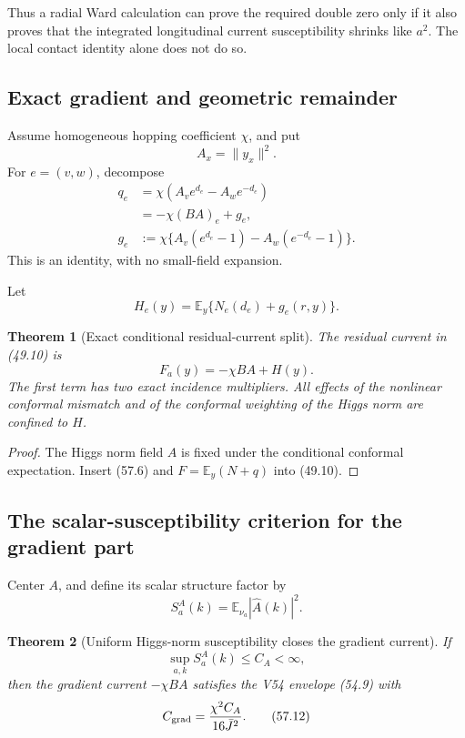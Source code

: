 \documentclass[11pt]{article}
\newtheorem{theorem}{Theorem}[section]
\theoremstyle{remark}
\begin{document}
Thus a radial Ward calculation can prove the required double zero only
if it also proves that the integrated longitudinal current
susceptibility shrinks like \(a^2\).  The local contact identity alone
does not do so.

\subsection{Exact gradient and geometric remainder}

Assume homogeneous hopping coefficient \(\chi\), and put
\[
 A_x=\|y_x\|^2.
\]
For \(e=(v,w)\), decompose
\[
\begin{aligned}
 q_e
 &=
 \chi(A_ve^{d_e}-A_we^{-d_e})\\
 &=
 -\chi(BA)_e+g_e,                                 \tag{57.6}\\
 g_e
 &:=
 \chi\{A_v(e^{d_e}-1)-A_w(e^{-d_e}-1)\}.          \tag{57.7}
\end{aligned}
\]
This is an identity, with no small-field expansion.

Let
\[
 H_e(y)
 =
 \mathbb E_y\{N_e(d_e)+g_e(r,y)\}.                \tag{57.8}
\]

\begin{theorem}[Exact conditional residual-current split]
\label{thm:v17v57-split}
The residual current in (49.10) is
\[
\boxed{
 F_a(y)=-\chi BA+H(y).}                           \tag{57.9}
\]
The first term has two exact incidence multipliers.  All effects of
the nonlinear conformal mismatch and of the conformal weighting of the
Higgs norm are confined to \(H\).
\end{theorem}

\begin{proof}
The Higgs norm field \(A\) is fixed under the conditional conformal
expectation.  Insert (57.6) and
\(F=\mathbb E_y(N+q)\) into (49.10).
\end{proof}

\subsection{The scalar-susceptibility criterion for the gradient part}

Center \(A\), and define its scalar structure factor by
\[
 S_a^A(k)
 =
 \mathbb E_{\nu_a}|\widehat A(k)|^2.              \tag{57.10}
\]

\begin{theorem}[Uniform Higgs-norm susceptibility closes the gradient
current]
\label{thm:v17v57-gradient}
If
\[
 \sup_{a,k}S_a^A(k)\leq C_A<\infty,               \tag{57.11}
\]
then the gradient current \(-\chi BA\) satisfies the V54 envelope
(54.9) with
\[
 C_{\rm grad}
 =
 \frac{\chi^2C_A}{16\bar J^2}.                    \tag{57.12}
\]
\end{theorem}
\end{document}
